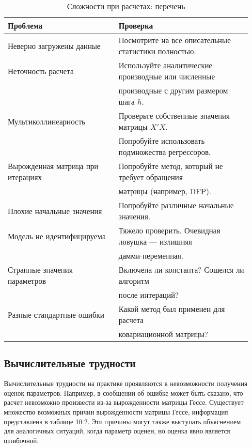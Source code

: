 \begin{table}[h]
\begin{center}
\caption{\label{tab:pred} Сложности при расчетах: перечень}
\begin{tabular}{ll}
\hline 
\hline
Проблема & Проверка \\ 
\hline 
Неверно загружены данные & Посмотрите на все описательные статистики полностью. \\
Неточность расчета & Используйте аналитические производные или численные \\
& производные с другим размером шага $h$. \\
Мультиколлинеарность & Проверьте собственные значения матрицы $X'X$. \\
& Попробуйте использовать подмножества регрессоров. \\ 
Вырожденная матрица при итерациях & Попробуйте метод, который не требует обращения \\
& матрицы (например, DFP). \\
Плохие начальные значения & Попробуйте различные начальные значения. \\
Модель не идентифицируема & Тяжело проверить. Очевидная ловушка --- излишняя \\
& дамми-переменная. \\
Странные значения параметров & Включена ли константа? Сошелся ли алгоритм \\
& после интераций? \\
Разные стандартные ошибки & Какой метод был применен для расчета \\
& ковариационной матрицы? \\
\hline 
\hline
\end{tabular} 
\end{center}
\end{table}

\subsection{Вычислительные трудности}

Вычислительные трудности на практике проявляются в невозможности получения оценок параметров. Например, в сообщении об ошибке может быть сказано, что расчет невозможно произвести из-за вырожденности матрицы Гессе. Существует множество возможных причин вырожденности матрицы Гессе, информация представлена в таблице 10.2. Эти причины могут также выступать объяснением для аналогичных ситуаций, когда параметр оценен, но оценка явно является ошибочной. 

